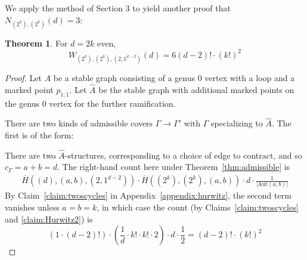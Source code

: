 \documentclass[thesis]{thesis-umich}           %
\newcommand{\Aut}{\text{Aut}}
\theoremstyle{definition}
\newtheorem{thm}{Theorem}[section]
\begin{document}
We apply the method of Section 3 to yield another proof that
$N_{(2^k),(2^k)}(d)=3$:

\begin{thm}
  \label{thm:genusreduction3}
  For $d=2k$ even,
  \[
  W_{(2^k),(2^k),(2,1^{d-2})}(d)=6(d-2)!\cdot (k!)^2
  \]
\end{thm}
\begin{proof}
  Let $A$ be a stable graph consisting of a genus $0$ vertex with a loop and a marked point $p_{1,1}$.
  Let $\hat A$ be the stable graph with additional marked points on the genus $0$ vertex for
  the further ramification.

There are two kinds of
admissible covers $\Gamma\to\Gamma'$ with $\Gamma$ specializing to $\hat A$. The first
is of the form:


            There are two $\hat A$-structures, corresponding to a choice
            of edge to contract, and so $c_{\Gamma}=a+b=d$. The right-hand count here under Theorem~\ref{thm:admissible} is
            \begin{align*}
              \overline H((d),(a,b),(2,1^{d-2}))\cdot \overline H((2^k),(2^k),(a,b))\cdot d\cdot\frac 1{|\Aut(a,b)|}
            \end{align*}
            By Claim~\ref{claim:twoscycles} in Appendix~\ref{appendix:hurwitz}, the second term vanishes unless $a=b=k$, in which case
            the count (by Claims~\ref{claim:twoscycles} and \ref{claim:Hurwitz2}) is
            \[
            (1\cdot (d-2)!)\cdot \left(\frac 1d\cdot k!\cdot k!\cdot 2\right)\cdot d\cdot\frac 12
            =(d-2)!\cdot (k!)^2
            \]


\end{proof}
\end{document}

